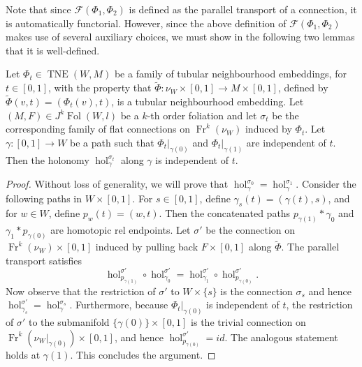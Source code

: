 \documentclass[10pt]{amsart}
\newcommand{\F}{{\mathcal{F}}}
\newcommand{\hol}{{\operatorname{hol}}}
\newcommand{\FolObj}{{\operatorname{Fol}}}
\newcommand{\TNE}{{\operatorname{TNE}}}
\newcommand{\Fr}{{\operatorname{Fr}}}
\numberwithin{theoremalpha}{section}
\numberwithin{equation}{section}
\numberwithin{definition}{section}
\numberwithin{theorem}{section}
\numberwithin{proposition}{section}
\numberwithin{lemma}{section}
\numberwithin{example}{section}
\numberwithin{remark}{section}
\numberwithin{corollary}{section}
\numberwithin{question}{section}
\numberwithin{problem}{section}
\numberwithin{assumption}{section}
\theoremstyle{named}
\numberwithin{equation}{section}
\begin{document}
Note that since $\F(\Phi_1,\Phi_2)$ is defined as the parallel transport of a connection, it is automatically functorial. 
However, since the above definition of $\F(\Phi_1,\Phi_2)$ makes use of several auxiliary choices, we must show in the following two lemmas that it is well-defined. 
\begin{lemma}\label{lem:stabilityofF}
Let $\Phi_{t} \in \TNE(W,M)$ be a family of tubular neighbourhood embeddings, for $t \in [0,1]$, with the property that $\tilde{\Phi} : \nu_{W} \times [0,1] \to M \times [0,1]$, defined by $\tilde{\Phi}(v,t) = (\Phi_{t}(v), t)$, is a tubular neighbourhood embedding. Let $(M,F) \in J^{k}\FolObj(W,l)$ be a $k$-th order foliation and let $\sigma_{t}$ be the corresponding family of flat connections on $\Fr^{k}(\nu_{W})$ induced by $\Phi_t$. Let $\gamma : [0,1] \to W$ be a path such that $\Phi_t|_{\gamma(0)}$ and $\Phi_{t}|_{\gamma(1)}$ are independent of $t$. Then the holonomy $\hol^{\sigma_t}_{\gamma}$ along $\gamma$ is independent of $t$. 
\end{lemma}
\begin{proof}
Without loss of generality, we will prove that $\hol^{\sigma_0}_{\gamma} = \hol^{\sigma_1}_{\gamma}$. Consider the following paths in $W \times [0,1]$. For $s \in [0,1]$, define $\gamma_{s}(t) = (\gamma(t), s)$, and for $w \in W$, define $p_{w}(t) = (w, t)$. Then the concatenated paths $p_{\gamma(1)} \ast \gamma_0$ and $\gamma_1 \ast p_{\gamma(0)}$ are homotopic rel endpoints. Let $\sigma'$ be the connection on $\Fr^{k}(\nu_{W}) \times [0,1]$ induced by pulling back $F \times [0,1]$ along $\tilde{\Phi}$. The parallel transport satisfies 
\[
\hol^{\sigma'}_{p_{\gamma(1)} } \circ \hol^{\sigma'}_{\gamma_0 } = \hol^{\sigma'}_{ \gamma_1} \circ  \hol^{\sigma'}_{ p_{\gamma(0)}}.  
\]
Now observe that the restriction of $\sigma'$ to $W \times \{ s \}$ is the connection $\sigma_{s}$ and hence $\hol^{\sigma'}_{\gamma_s} = \hol^{\sigma_s}_{\gamma} $. Furthermore, because $\Phi_t|_{\gamma(0)}$ is independent of $t$, the restriction of $\sigma'$ to the submanifold $\{ \gamma(0) \} \times [0,1]$ is the trivial connection on $\Fr^{k}(\nu_{W}|_{\gamma(0)}) \times [0,1]$, and hence $\hol^{\sigma'}_{ p_{\gamma(0)}} = id$. The analogous statement holds at $\gamma(1)$. This concludes the argument. 
\end{proof}
\end{document}
